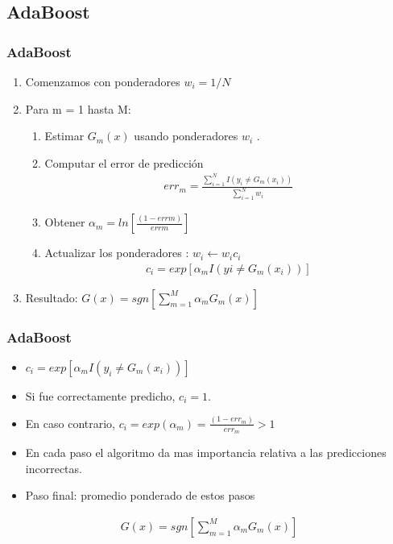 \documentclass[
  shownotes,
  xcolor={svgnames},
  hyperref={colorlinks,citecolor=DarkBlue,linkcolor=DarkRed,urlcolor=DarkBlue}
  , aspectratio=169]{beamer}
\begin{document}
\subsection{AdaBoost}
\begin{frame}[fragile]
\frametitle{AdaBoost}
\begin{enumerate}
\item Comenzamos con ponderadores $w_i = 1 / N$
\item Para m = 1 hasta M:
\begin{enumerate}
    \item Estimar $G_m(x)$ usando ponderadores $w_i$ .
    \item Computar el error de predicción
    \begin{align}
    err_m = \frac{\sum_{i=1}^N  I(y_i \neq G_m(x_i))}{\sum_{i=1}^N w_i}
    \end{align}
    \item Obtener $\alpha_m= ln \left[\frac{(1 - err m )}{ err m} \right]$
    \item Actualizar los ponderadores : $w_i \leftarrow w_i c_i$ 
    \begin{align}
    c_i = exp \left[\alpha_m  I (y i \neq G_m (x_i )) \right]
    \end{align}
    
\end{enumerate}
\item Resultado: $G(x) = sgn[\sum_{m = 1}^M \alpha_m G_m(x)]$
\end{enumerate}

\end{frame} 
\begin{frame}[fragile]
\frametitle{AdaBoost}

\begin{itemize}
\item $c_i = exp \left[ \alpha_m I(y_i \neq G_m (x_i )) \right]$
\medskip
\item Si fue correctamente predicho, $c_i = 1$. 
\medskip
\item En caso contrario, $c_i = exp (\alpha_m ) = \frac{(1 - err_m ) }{err_m} > 1$ 
\medskip
\item En cada paso el algoritmo da mas importancia relativa a las predicciones incorrectas.
\medskip
\item Paso final: promedio ponderado de estos pasos
\end{itemize}
\begin{align}
G(x) = sgn[\sum_{m = 1}^M \alpha_m G_m(x)]
\end{align}

\end{frame}
\end{document}
